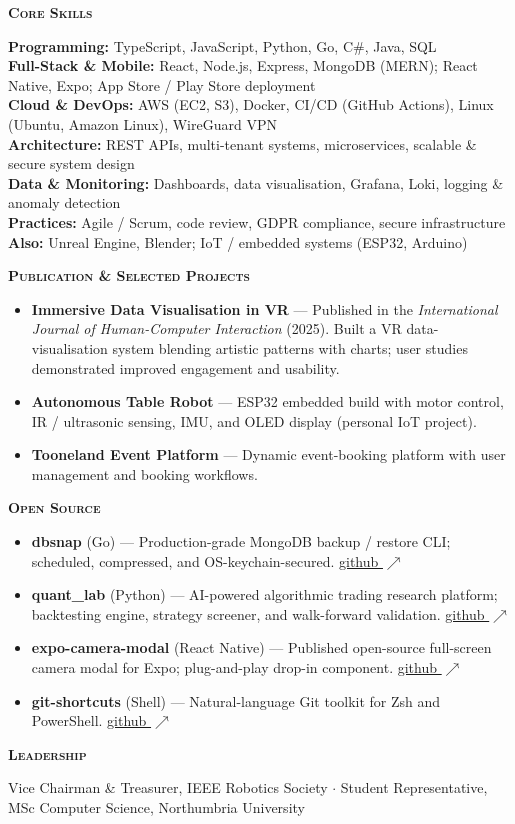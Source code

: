 \documentclass[a4paper,10pt]{article}
\newcommand{\header}[1]{%
    \vspace*{6pt}%
    {\color{accent}\textbf{\scshape #1}}\hspace{4pt}%
    {\color{accent}\hrulefill}\par\vspace*{2pt}%
}
\begin{document}
\header{Core Skills}
\textbf{Programming:} TypeScript, JavaScript, Python, Go, C\#, Java, SQL\\
\textbf{Full-Stack \& Mobile:} React, Node.js, Express, MongoDB (MERN); React Native, Expo; App Store / Play Store deployment\\
\textbf{Cloud \& DevOps:} AWS (EC2, S3), Docker, CI/CD (GitHub Actions), Linux (Ubuntu, Amazon Linux), WireGuard VPN\\
\textbf{Architecture:} REST APIs, multi-tenant systems, microservices, scalable \& secure system design\\
\textbf{Data \& Monitoring:} Dashboards, data visualisation, Grafana, Loki, logging \& anomaly detection\\
\textbf{Practices:} Agile / Scrum, code review, GDPR compliance, secure infrastructure\\
\textbf{Also:} Unreal Engine, Blender; IoT / embedded systems (ESP32, Arduino)

\header{Publication \& Selected Projects}
\begin{itemize}
    \item \textbf{Immersive Data Visualisation in VR} --- Published in the \textit{International Journal of Human-Computer Interaction} (2025). Built a VR data-visualisation system blending artistic patterns with charts; user studies demonstrated improved engagement and usability.
    \item \textbf{Autonomous Table Robot} --- ESP32 embedded build with motor control, IR / ultrasonic sensing, IMU, and OLED display (personal IoT project).
    \item \textbf{Tooneland Event Platform} --- Dynamic event-booking platform with user management and booking workflows.
\end{itemize}

\header{Open Source}
\begin{itemize}
    \item \textbf{dbsnap} (Go) --- Production-grade MongoDB backup / restore CLI; scheduled, compressed, and OS-keychain-secured. \href{https://github.com/aroonsekar/dbsnap}{github $\nearrow$}
    \item \textbf{quant\_lab} (Python) --- AI-powered algorithmic trading research platform; backtesting engine, strategy screener, and walk-forward validation. \href{https://github.com/aroonsekar/quant_lab}{github $\nearrow$}
    \item \textbf{expo-camera-modal} (React Native) --- Published open-source full-screen camera modal for Expo; plug-and-play drop-in component. \href{https://github.com/aroonsekar/expo-camera-modal}{github $\nearrow$}
    \item \textbf{git-shortcuts} (Shell) --- Natural-language Git toolkit for Zsh and PowerShell. \href{https://github.com/aroonsekar/git-shortcuts}{github $\nearrow$}
\end{itemize}

\header{Leadership}
Vice Chairman \& Treasurer, IEEE Robotics Society $\cdot$ Student Representative, MSc Computer Science, Northumbria University
\end{document}
